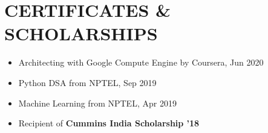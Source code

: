 \documentclass[letterpaper,11pt]{article}
\newcommand{\achievementItem}[1]{
  \item\small{
    {#1 \vspace{-6pt}}
  }
}
\newcommand{\resumeSubHeadingListEnd}{\end{itemize}}
\begin{document}
\section{CERTIFICATES \& SCHOLARSHIPS}

\begin{itemize}[leftmargin=0.2in]
  \achievementItem{Architecting with Google Compute Engine by Coursera, Jun 2020}
  \achievementItem{Python DSA from NPTEL, Sep 2019}
  \achievementItem{Machine Learning from NPTEL, Apr 2019}
  \achievementItem{Recipient of {\bf Cummins India Scholarship '18}}
\end{itemize}

\end{document}
